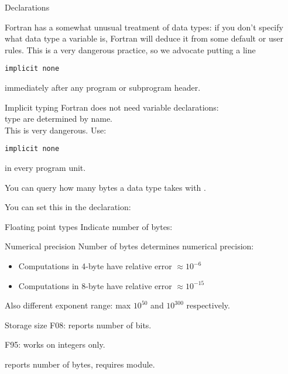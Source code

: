  {Declarations}
\label{sec:ftype}

Fortran has a somewhat unusual treatment of data types: if you don't
specify what data type a variable is, Fortran will deduce it from some
default or user rules. This is a very dangerous practice, so we
advocate putting a line
\begin{verbatim}
implicit none
\end{verbatim}
immediately after any program or subprogram header.

\begin{slide}{Implicit typing}
  \label{sl:fimplicit}
  Fortran does not need variable declarations:\\
  type are determined by name.\\
  This is very dangerous. Use:
\begin{verbatim}
implicit none
\end{verbatim}
  in every program unit.
\end{slide}

You can query how many bytes a data type takes with
.

You can set this in the declaration:
%

\begin{slide}{Floating point types}
  \label{sl:ffloat}
  Indicate number of bytes:
\end{slide}

\begin{block}{Numerical precision}
  \label{sl:fprecision48}
  Number of bytes determines numerical precision:
  \begin{itemize}
  \item Computations in 4-byte have relative error $\approx 10^{-6}$
  \item Computations in 8-byte have relative error $\approx 10^{-15}$
  \end{itemize}
  Also different exponent range: max $10^{50}$ and $10^{300}$ respectively.
\end{block}

\begin{block}{Storage size}
  F08:  reports number of bits.

  F95:  works on integers only.

   reports number of bytes, requires
   module.
\end{block}


